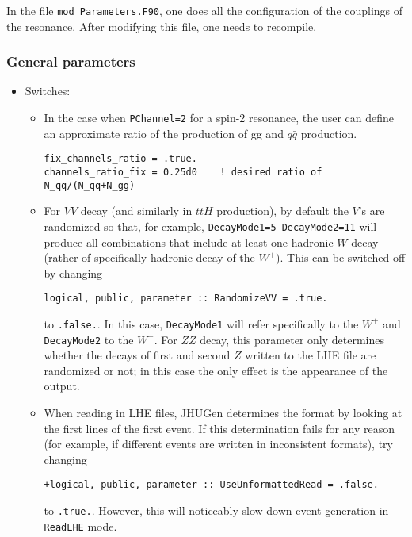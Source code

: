\documentclass[aps,superscriptaddress,nofootinbib]{revtex4}
\begin{document}
In the file \verb|mod_Parameters.F90|, one does all the configuration of the couplings of the resonance.
After modifying this file, one needs to recompile.

\subsubsection{ General parameters }

\begin{itemize}
\item Switches:
\begin{itemize}

\item
In the case when \verb|PChannel=2| for a spin-2 resonance, the user can define an approximate ratio of the production of gg and $q\bar{q}$ production.

\begin{verbatim}
fix_channels_ratio = .true.
channels_ratio_fix = 0.25d0    ! desired ratio of N_qq/(N_qq+N_gg)
\end{verbatim}

\item
For $VV$ decay (and similarly in $ttH$ production), by default the $V$'s are randomized so that, for example, \verb|DecayMode1=5 DecayMode2=11| will produce all combinations that include at least one hadronic $W$ decay (rather of specifically hadronic decay of the $W^+$).  This can be switched off by changing
\begin{verbatim}
logical, public, parameter :: RandomizeVV = .true.
\end{verbatim}
to \verb|.false.|.  In this case, \verb|DecayMode1| will refer specifically to the $W^+$ and \verb|DecayMode2| to the $W^-$.  For $ZZ$ decay, this parameter only determines whether the decays of first and second $Z$ written to the LHE file are randomized or not; in this case the only effect is the appearance of the output.

\item
When reading in LHE files, JHUGen determines the format by looking at the first lines of the first event.  If this determination fails for any reason (for example, if different events are written in inconsistent formats), try changing
\begin{verbatim}
+logical, public, parameter :: UseUnformattedRead = .false.
\end{verbatim}
to \verb|.true.|.  However, this will noticeably slow down event generation in \verb|ReadLHE| mode.




\end{itemize}
\end{itemize}
\end{document}
